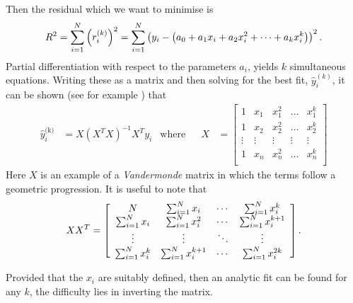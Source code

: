 \documentclass[../full_thesis/full_thesis.tex]{subfiles}
\begin{document}
\begin{subappendices}
Then the residual which we want to minimise is
\begin{equation}
R^{2} = \sum_{i=1}^{N}\left(r_i^{(k)}\right)^{2}
      = \sum_{i=1}^{N}\left(y_{i} - \left(a_{0} + a_{1}x_{i} + a_{2}x_{i}^{2} +
        \dots + a_{k} x_{i}^{k}\right)\right)^{2}.
\end{equation}
Partial differentiation with respect to the parameters $a_{i}$, yields $k$
simultaneous equations. Writing these as a matrix and then solving
for the best fit, $\hat{y}^(k)_i$, it can be shown (see for example
\citeauthor{WolframLeastSquares}) that
\begin{align}
\hat{y}^{\textrm{(k)}}_{i} & = X \left(X^{T}X\right)^{-1} X^{T} y_{i} & \textrm{where} & &
X & = \left[\begin{array}{ccccc}
1 & x_{1} & x_{1}^{2} & \dots & x_{1}^{k} \\
1 & x_{2} & x_{2}^{2} & \dots & x_{2}^{k} \\
\vdots & \vdots & \vdots & \vdots & \vdots \\
1 & x_{n} & x_{n}^{2} & \dots & x_{n}^{k} \\
\end{array}\right]
\end{align}
Here $X$ is an example of a \emph{Vandermonde} matrix in which the terms follow
a geometric progression. It is useful to note that
\begin{equation}
XX^{T} = \left[\begin{array}{cccc}
N & \sum_{i=1}^{N}x_{i} & \cdots &  \sum_{i=1}^{N}x_{i}^{k} \\
\sum_{i=1}^{N}x_{i} & \sum_{i=1}^{N}x_{i}^{2} & \cdots &  \sum_{i=1}^{N}x_{i}^{k+1} \\
\vdots & \vdots & \ddots & \vdots \\
\sum_{i=1}^{N}x_{i}^{k} & \sum_{i=1}^{N}x_{i}^{k+1} & \cdots &  \sum_{i=1}^{N}x_{i}^{2k}
\end{array}\right].
\end{equation}

Provided that the $x_{i}$ are suitably defined, then an analytic fit can be
found for any $k$, the difficulty lies in inverting the matrix.


\end{subappendices}
\end{document}
